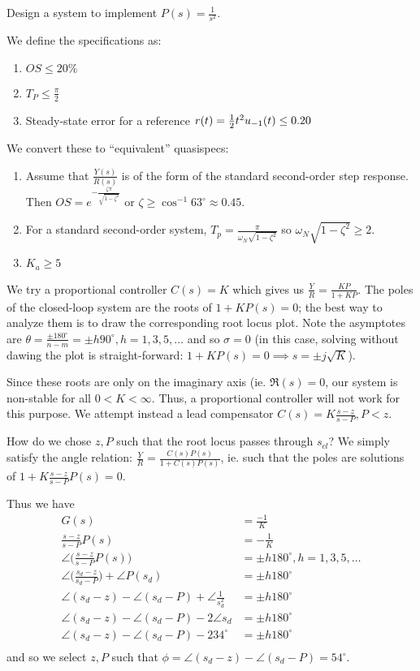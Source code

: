 \documentclass[12pt]{article}
\begin{document}
\begin{example}
Design a system to implement $P(s) = \frac{1}{s^2}$.

We define the specifications as:
\begin{enumerate}
\item $OS \leq 20\%$
\item $T_P \leq \frac{\pi}{2}$
\item Steady-state error for a reference $r(t) = \frac{1}{2} t^2 u_{-1} (t) \leq 0.20$
\end{enumerate}

We convert these to ``equivalent'' quasispecs:
\begin{enumerate}
\item Assume that $\frac{Y(s)}{R(s)}$ is of the form of the standard second-order step response. Then $OS = e^{-\frac{\zeta\pi}{\sqrt{1-\zeta^2}}}$ or $\zeta \geq \cos^{-1} 63^\circ \approx 0.45$.
\item For a standard second-order system, $T_p = \frac{\pi}{\omega_N \sqrt{1-\zeta^2}}$ so $\omega_N\sqrt{1-\zeta^2} \geq 2$.
\item $K_a \geq 5$
\end{enumerate}

We try a proportional controller $C(s) = K$ which gives us $\frac{Y}{R} = \frac{KP}{1 + KP}$. The poles of the closed-loop system are the roots of $1 + KP(s) = 0$; the best way to analyze them is to draw the corresponding root locus plot. Note the asymptotes are $\theta = \frac{\pm 180^\circ}{n-m} = \pm h 90^\circ, h = 1,3,5,\dots$ and so $\sigma = 0$ (in this case, solving without dawing the plot is straight-forward: $1 + KP(s) = 0 \implies s = \pm j\sqrt{K}$).

Since these roots are only on the imaginary axis (ie. $\Re(s) = 0$, our system is non-stable for all $0 < K < \infty$. Thus, a proportional controller will not work for this purpose. We attempt instead a lead compensator $C(s) = K\frac{s-z}{s-P}, P < z$.

How do we chose $z, P$ such that the root locus passes through $s_{cl}$? We simply satisfy the angle relation: $\frac{Y}{R} = \frac{C(s)P(s)}{1 + C(s)P(s)}$, ie. such that the poles are solutions of $1 + K\frac{s-z}{s-P} P(s) = 0$.

Thus we have
\begin{align*}
G(s) &= \frac{-1}{K} \\
\frac{s-z}{s-P} P(s) &= -\frac{1}{K} \\
\angle \bigg(\frac{s-z}{s-P} P(s)\bigg) &= \pm h180^\circ, h = 1,3,5,\dots\\
\angle \bigg(\frac{s_d - z}{s_d - P} \bigg) + \angle P(s_d) &= \pm h180^\circ \\
\angle(s_d - z) - \angle(s_d - P) + \angle \frac{1}{s_d^2} &= \pm h180^\circ \\
\angle(s_d - z) - \angle(s_d - P) - 2\angle s_d &= \pm h180^\circ \\
\angle(s_d - z) - \angle(s_d - P) - 234^\circ &= \pm h180^\circ \\
\end{align*}
and so we select $z, P$ such that $\phi = \angle(s_d - z) - \angle(s_d - P) = 54^\circ$.


\end{example}
\end{document}
